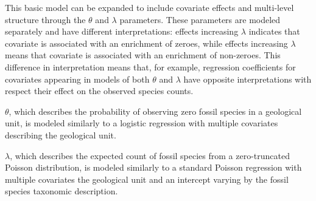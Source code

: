 \documentclass[12pt,letterpaper]{article}
\begin{document}
This basic model can be expanded to include covariate effects and multi-level structure through the \(\theta\) and \(\lambda\) parameters. These parameters are modeled separately and have different interpretations: effects increasing \(\lambda\) indicates that covariate is associated with an enrichment of zeroes, while effects increasing \(\lambda\) means that covariate is associated with an enrichment of non-zeroes. This difference in interpretation means that, for example, regression coefficients for covariates appearing in models of both \(\theta\) and \(\lambda\) have opposite interpretations with respect their effect on the observed species counts.


\(\theta\), which describes the probability of observing zero fossil species in a geological unit, is modeled similarly to a logistic regression with multiple covariates describing the geological unit.

\(\lambda\), which describes the expected count of fossil species from a zero-truncated Poisson distribution, is modeled similarly to a standard Poisson regression with multiple covariates the geological unit and an intercept varying by the fossil species taxonomic description.
\end{document}
